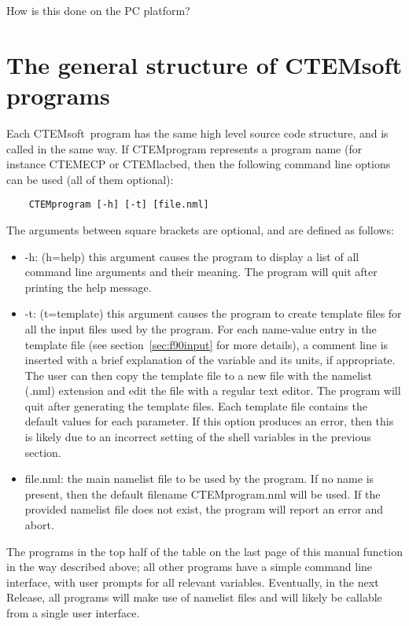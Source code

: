 \documentclass[DIV=calc, paper=letter, fontsize=11pt]{scrartcl}	 %
\newcommand{\ctp}{\textsf{CTEMsoft}}
\begin{document}
{\color{blue}How is this done on the PC platform?}

\newpage
\section{The general structure of CTEMsoft programs\label{sec:structure}}
Each \ctp\ program has the same high level source code structure, and is called in the same way.  If \textsf{CTEMprogram} represents 
a program name (for instance \textsf{CTEMECP} or \textsf{CTEMlacbed}, then the following command line options can be used (all of them optional):
\begin{verbatim}
	CTEMprogram [-h] [-t] [file.nml]
\end{verbatim}
The arguments  between square brackets are optional, and are defined as follows:
\begin{itemize}
	\item \textsf{-h}: (h=help) this argument causes the program to display a list of all command line arguments and their meaning.  The program will quit after printing 
	the help message.
	\item \textsf{-t}: (t=template) this argument causes the program to create template files for all the input files used by the program.  For each
	name-value entry in the template file (see section~\ref{sec:f90input} for more details), a comment line is inserted with a brief explanation 
	of the variable and its units, if appropriate.  The user can then copy the template file to a new file with the namelist (.nml) extension and edit the 
	file with a regular text editor.  The program will quit after generating the template files.  Each template file contains the default values for each parameter.
	If this option produces an error, then this is likely due to an incorrect setting of the shell variables in the previous section.
	\item \textsf{file.nml}: the main namelist file to be used by the program.  If no name is present, then the default filename CTEMprogram.nml will be used.  If the 
	provided namelist file does not exist, the program will report an error and abort.
\end{itemize}

The programs in the top half of the table on the last page of this manual function in the way described above; all other programs
have a simple command line interface, with user prompts for all relevant variables.  Eventually, in the next Release, all programs
will make use of namelist files and will likely be callable from a single user interface.
\end{document}
